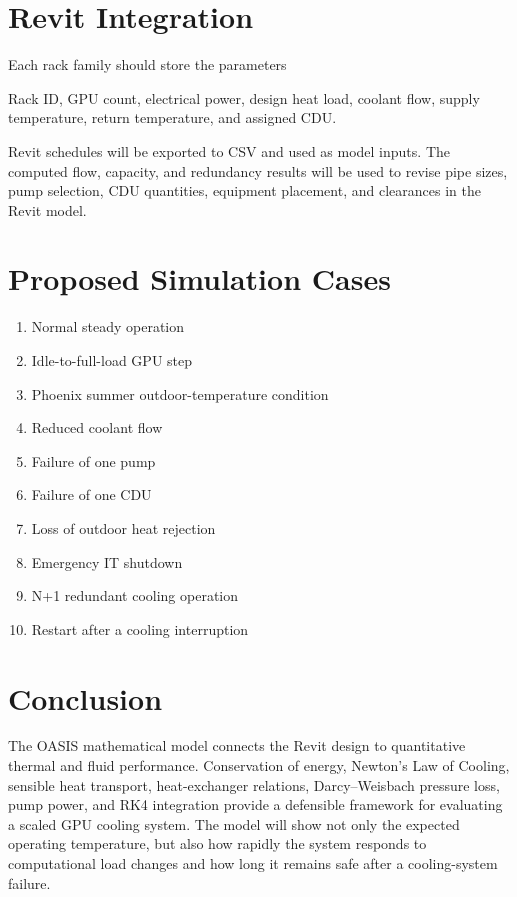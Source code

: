 \documentclass[11pt]{article}
\begin{document}
\section{Revit Integration}

Each rack family should store the parameters

\begin{center}
Rack ID, GPU count, electrical power, design heat load, coolant flow, supply
temperature, return temperature, and assigned CDU.
\end{center}

Revit schedules will be exported to CSV and used as model inputs. The computed flow,
capacity, and redundancy results will be used to revise pipe sizes, pump selection,
CDU quantities, equipment placement, and clearances in the Revit model.

\section{Proposed Simulation Cases}

\begin{enumerate}[leftmargin=2em]
    \item Normal steady operation
    \item Idle-to-full-load GPU step
    \item Phoenix summer outdoor-temperature condition
    \item Reduced coolant flow
    \item Failure of one pump
    \item Failure of one CDU
    \item Loss of outdoor heat rejection
    \item Emergency IT shutdown
    \item N+1 redundant cooling operation
    \item Restart after a cooling interruption
\end{enumerate}

\section{Conclusion}

The OASIS mathematical model connects the Revit design to quantitative thermal and
fluid performance. Conservation of energy, Newton's Law of Cooling, sensible heat
transport, heat-exchanger relations, Darcy--Weisbach pressure loss, pump power, and
RK4 integration provide a defensible framework for evaluating a scaled GPU cooling
system. The model will show not only the expected operating temperature, but also
how rapidly the system responds to computational load changes and how long it remains
safe after a cooling-system failure.
\end{document}
